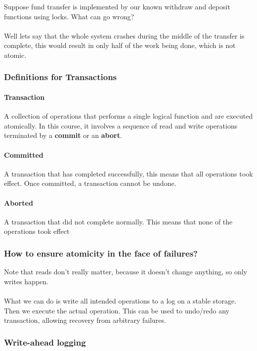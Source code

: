 \documentclass{article}
\begin{document}
Suppose fund transfer is implemented by our known withdraw and deposit functions using locks. What can go wrong?
\\
\\
Well lets say that the whole system crashes during the middle of the transfer is complete, this would result in only half of the work being done, which is not atomic.

\subsubsection{Definitions for Transactions}

\paragraph{Transaction} A collection of operations that performs a single logical function and are executed atomically. In this course, it involves a sequence of read and write operations terminated by a \textbf{commit} or an \textbf{abort}.

\paragraph{Committed} A transaction that has completed successfully, this means that all operations took effect. Once committed, a transaction cannot be undone.

\paragraph{Aborted} A transaction that did not complete normally. This means that none of the operations took effect

\subsubsection{How to ensure atomicity in the face of failures?}

Note that reads don't really matter, because it doesn't change anything, so only writes happen.
\\
\\
What we can do is write all intended operations to a log on a stable storage. Then we execute the actual operation. This can be used to undo\slash redo any transaction, allowing recovery from arbitrary failures.

\subsubsection{Write-ahead logging}
\end{document}
